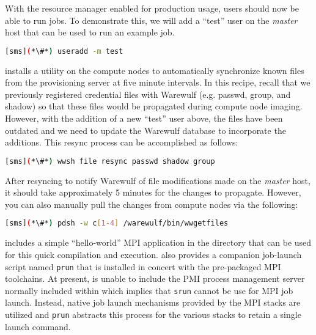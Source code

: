 With the resource manager enabled for production usage, users should now be
able to run jobs. To demonstrate this, we will add a ``test'' user on the {\em master}
host that can be used to run an example job.

\begin{lstlisting}[language=bash,keywords={}]
[sms](*\#*) useradd -m test
\end{lstlisting}

\Warewulf{} installs a utility on the compute nodes to automatically 
synchronize known files from the provisioning server at five minute intervals. In this
recipe, recall that we previously registered credential files with Warewulf (e.g. passwd,
group, and shadow) so that these files would be propagated during compute node
imaging. However, with the addition of a new ``test'' user above, the files
have been outdated and we need to update the Warewulf database to incorporate
the additions. This resync process can be accomplished as follows:

\begin{lstlisting}[language=bash,keywords={}]
[sms](*\#*) wwsh file resync passwd shadow group
\end{lstlisting}

\begin{center}
\begin{tcolorbox}[]
\small
After resyncing to notify Warewulf of file modifications made on the {\em
master} host, it should take approximately 5 minutes for the changes to
propagate. However, you can also manually pull the changes from compute nodes
via the following:
\begin{lstlisting}[language=bash,keywords={}]
[sms](*\#*) pdsh -w c[1-4] /warewulf/bin/wwgetfiles 
\end{lstlisting}
\end{tcolorbox}
\end{center}


\OHPC{} includes a simple ``hello-world'' MPI application in the
 directory that can be used for this quick
compilation and execution. \OHPC{} also provides a companion job-launch script
named \texttt{prun} that is installed in concert with the pre-packaged MPI
toolchains. At present, \OHPC{} is unable to include the PMI process management
server normally included within \SLURM{} which implies that \texttt{srun} cannot
be use for MPI job launch. Instead, native job launch mechanisms provided by
the MPI stacks are utilized and \texttt{prun} abstracts this process for the
various stacks to retain a single launch command.

